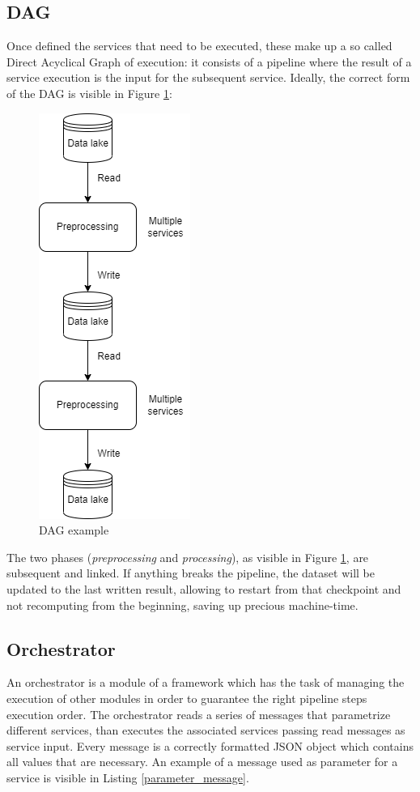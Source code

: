 \documentclass[\main/main.tex]{subfiles}
\begin{document}
\subsection{DAG}
Once defined the services that need to be executed, these make up a so called Direct Acyclical Graph of execution: it consists of a pipeline where the result of a service execution is the input for the subsequent service. Ideally, the correct form of the DAG is visible in Figure \ref{fig:dag_example}:
\begin{figure}[H]
    \centering
    \includegraphics[scale=.68]{images/architecture/dag_theory.png}
    \caption{DAG example}
    \label{fig:dag_example}
\end{figure}
The two phases (\emph{preprocessing} and \emph{processing}), as visible in Figure \ref{fig:dag_example}, are subsequent and linked. If anything breaks the pipeline, the dataset will be updated to the last written result, allowing to restart from that checkpoint and not recomputing from the beginning, saving up precious machine-time.
\subsection{Orchestrator}
An orchestrator is a module of a framework which has the task of managing the execution of other modules in order to guarantee the right pipeline steps execution order. The orchestrator reads a series of messages that parametrize different services, than executes the associated services passing read messages as service input. Every message is a correctly formatted JSON object which contains all values that are necessary. An example of a message used as parameter for a service is visible in Listing \ref{parameter_message}.
\end{document}
